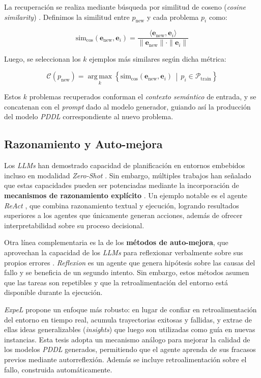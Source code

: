 La recuperación se realiza mediante búsqueda por similitud de coseno (\textit{cosine similarity}) \parencite{singhal2001modern}. Definimos la similitud entre \( p_{\text{new}} \) y cada problema \( p_i \) como:

\[
\text{sim}_{\cos}(\mathbf{e}_{\text{new}}, \mathbf{e}_i) = \frac{\langle \mathbf{e}_{\text{new}}, \mathbf{e}_i \rangle}{\|\mathbf{e}_{\text{new}}\| \cdot \|\mathbf{e}_i\|}
\]

Luego, se seleccionan los \( k \) ejemplos más similares según dicha métrica:

\[
\mathcal{C}(p_{\text{new}}) = \operatorname*{arg\,max}_k \left\{ \text{sim}_{\cos}(\mathbf{e}_{\text{new}}, \mathbf{e}_i) \,\middle|\, p_i \in \mathcal{P}_{\text{train}} \right\}
\]

Estos \( k \) problemas recuperados conforman el \textit{contexto semántico} de entrada, y se concatenan con el \textit{prompt} dado al modelo generador, guiando así la producción del modelo \textit{PDDL} correspondiente al nuevo problema.

\subsection{Razonamiento y Auto-mejora}

Los \textit{LLMs} han demostrado capacidad de planificación en entornos embebidos incluso en modalidad \textit{Zero-Shot} \parencite{huang2022language}. Sin embargo, múltiples trabajos han señalado que estas capacidades pueden ser potenciadas mediante la incorporación de \textbf{mecanismos de razonamiento explícito} \parencite{yao2023tree, wei2022chain}. Un ejemplo notable es el agente \textit{ReAct} \parencite{yao2023react}, que combina razonamiento textual y ejecución, logrando resultados superiores a los agentes que únicamente generan acciones, además de ofrecer interpretabilidad sobre su proceso decisional.

Otra línea complementaria es la de los \textbf{métodos de auto-mejora}, que aprovechan la capacidad de los \textit{LLMs} para reflexionar verbalmente sobre sus propios errores \parencite{shinn2023reflexion, liu2023reflect}. \textit{Reflexion} \parencite{shinn2023reflexion} es un agente que genera hipótesis sobre las causas del fallo y se beneficia de un segundo intento. Sin embargo, estos métodos asumen que las tareas son repetibles y que la retroalimentación del entorno está disponible durante la ejecución.

\textit{ExpeL} propone un enfoque más robusto: en lugar de confiar en retroalimentación del entorno en tiempo real, acumula trayectorias exitosas y fallidas, y extrae de ellas ideas generalizables (\textit{insights}) que luego son utilizadas como guía en nuevas instancias. Esta tesis adopta un mecanismo análogo para mejorar la calidad de los modelos \textit{PDDL} generados, permitiendo que el agente aprenda de sus fracasos previos mediante autorreflexión. Además se incluye retroalimentación sobre el fallo, construida automáticamente.

